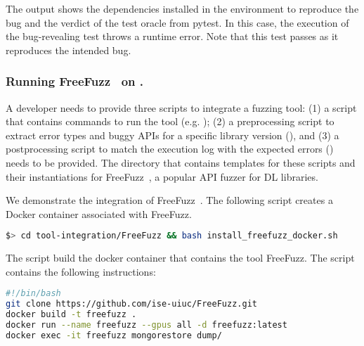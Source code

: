 \documentclass[sigconf,screen]{acmart}
\begin{document}
The output shows the dependencies installed in the environment to
reproduce the bug and the verdict of the test oracle from pytest. In
this case, the execution of the bug-revealing test throws a runtime
error. Note that this test passes as it reproduces the intended bug.



\subsubsection{Running FreeFuzz~\cite{wei2022free} on \tname.}\label{sec:running-free-fuzz}

A developer needs to provide three scripts to integrate a fuzzing
tool: (1) a script that contains commands to run the tool (e.g. ); (2) a
preprocessing script to extract error types and buggy APIs for a
specific library version (), and (3) a postprocessing script to match the
execution log with the expected errors () needs to be provided.
The
directory  that contains templates for these
scripts and their instantiations for FreeFuzz~\cite{wei2022free}, a
popular API fuzzer for DL libraries.

We demonstrate the integration of FreeFuzz~\cite{wei2022free}. The
following script creates a Docker container associated with FreeFuzz.

\begin{lstlisting}[language=bash,basicstyle=\small,keywords={}]
$> cd tool-integration/FreeFuzz && bash install_freefuzz_docker.sh
\end{lstlisting}

\noindent
The script  build the docker container
that contains the tool FreeFuzz. The script contains the
following instructions:

\begin{lstlisting}[language=bash,basicstyle=\small,keywords={}]
#!/bin/bash
git clone https://github.com/ise-uiuc/FreeFuzz.git
docker build -t freefuzz .
docker run --name freefuzz --gpus all -d freefuzz:latest
docker exec -it freefuzz mongorestore dump/
\end{lstlisting}
\end{document}
